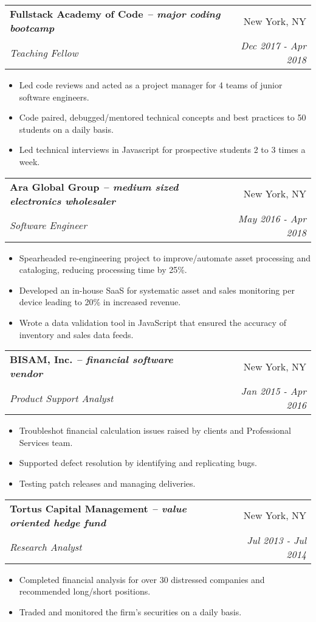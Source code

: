 \documentclass[letterpaper,10pt]{article}
\makeatletter
\newcommand{\resumeItemSimple}[1]{
    \item\small{
      {#1}{\vspace{-2pt}}
    }
  }
\newcommand{\resumeSubheading}[4]{
    \vspace{-1pt}\item
      \begin{tabular*}{0.97\textwidth}{l@{\extracolsep{\fill}}r}
        \textbf{#1} & #2 \\
        \textit{\small#3} & \textit{\small #4} \\
      \end{tabular*}\vspace{-5pt}
  }
\newcommand{\resumeItemListStart}{\begin{itemize}}
\newcommand{\resumeItemListEnd}{\end{itemize}\vspace{-5pt}}
\newcommand{\engineerType}{Software Engineer}
\makeatother
\begin{document}
      \resumeSubheading
        {Fullstack Academy of Code \normalfont\textit{-- major coding bootcamp}}{New York, NY}
        {Teaching Fellow}{Dec 2017 - Apr 2018}
        \resumeItemListStart
          \resumeItemSimple{Led code reviews and acted as a project manager for 4 teams of junior software engineers.}
          \resumeItemSimple{Code paired, debugged/mentored technical concepts and best practices to 50 students on a daily basis.}
          \resumeItemSimple{Led technical interviews in Javascript for prospective students 2 to 3 times a week.}
        \resumeItemListEnd

      \resumeSubheading
        {Ara Global Group \normalfont\textit{-- medium sized electronics wholesaler}}{New York, NY}
        {\engineerType{}}{May 2016 - Apr 2018}
        \resumeItemListStart
        	\resumeItemSimple{Spearheaded re-engineering project to improve/automate asset processing and  cataloging, reducing processing time by 25\%.}
          \resumeItemSimple{Developed an in-house SaaS for systematic asset and sales monitoring per device leading to 20\% in increased revenue.}
          \resumeItemSimple{Wrote a data validation tool in JavaScript that ensured the accuracy of inventory and sales data feeds.}
        \resumeItemListEnd

      \resumeSubheading
        {BISAM, Inc. \normalfont\textit{-- financial software vendor}}{New York, NY}
        {Product Support Analyst}{Jan 2015 - Apr 2016}
        \resumeItemListStart
          \resumeItemSimple{Troubleshot financial calculation issues raised by clients and Professional Services team.}
          \resumeItemSimple{Supported defect resolution by identifying and replicating bugs.}
          \resumeItemSimple{Testing patch releases and managing deliveries.}
        \resumeItemListEnd

      \resumeSubheading
        {Tortus Capital Management \normalfont\textit{-- value oriented hedge fund}}{New York, NY}
        {Research Analyst}{Jul 2013 - Jul 2014}
        \resumeItemListStart
          \resumeItemSimple{Completed financial analysis for over 30 distressed companies and recommended long/short positions.}
          \resumeItemSimple{Traded and monitored the firm's securities on a daily basis.}
        \resumeItemListEnd
\end{document}
